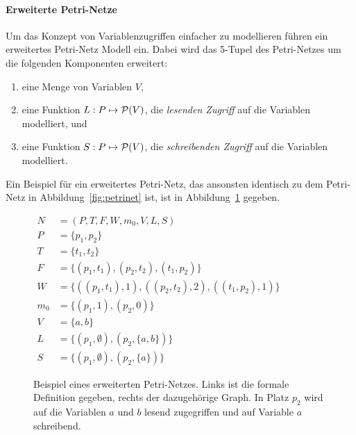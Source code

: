 \paragraph{Erweiterte Petri-Netze}
Um das Konzept von Variablenzugriffen einfacher zu modellieren führen \textcite{Goel1990} ein erweitertes Petri-Netz Modell ein. Dabei wird das 5-Tupel des Petri-Netzes um die folgenden Komponenten erweitert:
\begin{enumerate}
	\item eine Menge von Variablen $V$,
	\item eine Funktion $L: P \mapsto \mathcal{P}(V)$, die \emph{lesenden Zugriff} auf die Variablen modelliert, und
	\item eine Funktion $S: P \mapsto \mathcal{P}(V)$, die \emph{schreibenden Zugriff} auf die Variablen modelliert.
\end{enumerate}
Ein Beispiel für ein erweitertes Petri-Netz, das ansonsten identisch zu dem Petri-Netz in Abbildung~\ref{fig:petrinet} ist, ist in Abbildung~\ref{fig:augpetrinet} gegeben.
\begin{figure}
\centering
	\begin{minipage}[c]{.49\textwidth}
		$\begin{aligned}
			N &= (P,T,F,W,m_0, V, L, S)\\
			P &= \{p_1, p_2\}\\
			T &= \{t_1, t_2\}\\
			F &= \{(p_1, t_1), (p_2, t_2), (t_1, p_2)\}\\
			W &= \{((p_1, t_1),1), ((p_2, t_2),2), ((t_1, p_2), 1)\}\\
			m_0 &= \{(p_1, 1), (p_2, 0)\}\\
			V &= \{a,b\}\\
			L &= \{(p_1,\emptyset),(p_2,\{a,b\})\}\\
			S &= \{(p_1,\emptyset),(p_2,\{a\})\}
		\end{aligned}$
	\end{minipage}
	\hfill
	\begin{minipage}[c]{.49\textwidth}
	\end{minipage}
	\caption{Beispiel eines erweiterten Petri-Netzes. Links ist die formale Definition gegeben, rechts der dazugehörige Graph. In Platz $p_2$ wird auf die Variablen $a$ und $b$ lesend zugegriffen und auf Variable $a$ schreibend.}\label{fig:augpetrinet}
\end{figure}